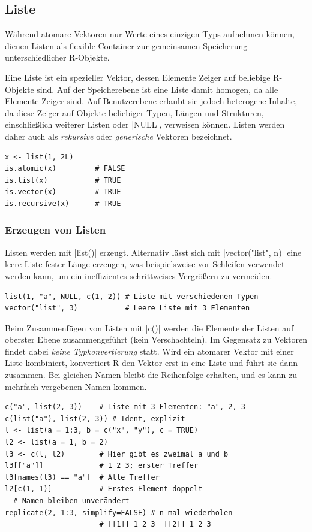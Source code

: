 \documentclass[10pt,twocolumn]{scrartcl}
\renewcommand{\lstinline}{\mycoloredinline}
\begin{document}
\subsection{Liste}

Während atomare Vektoren nur Werte eines einzigen Typs aufnehmen können, dienen Listen als flexible Container zur gemeinsamen Speicherung unterschiedlicher R-Objekte.

Eine Liste ist ein spezieller Vektor, dessen Elemente Zeiger auf beliebige R-Objekte sind. Auf der Speicherebene ist eine Liste damit homogen, da alle Elemente Zeiger sind. Auf Benutzerebene erlaubt sie jedoch heterogene Inhalte, da diese Zeiger auf Objekte beliebiger Typen, Längen und Strukturen, einschließlich weiterer Listen oder \lstinline|NULL|, verweisen können. Listen werden daher auch als \emph{rekursive} oder \emph{generische} Vektoren bezeichnet.


\begin{lstlisting}
x <- list(1, 2L)
is.atomic(x)         # FALSE
is.list(x)           # TRUE
is.vector(x)         # TRUE
is.recursive(x)      # TRUE
\end{lstlisting}


\subsubsection{Erzeugen von Listen}

Listen werden mit \lstinline|list()| erzeugt. Alternativ lässt sich mit \lstinline|vector("list", n)| eine leere Liste fester Länge erzeugen, was beispielsweise vor Schleifen verwendet werden kann, um ein ineffizientes schrittweises Vergrößern zu vermeiden.

\begin{lstlisting}
list(1, "a", NULL, c(1, 2)) # Liste mit verschiedenen Typen
vector("list", 3)           # Leere Liste mit 3 Elementen
\end{lstlisting}

Beim Zusammenfügen von Listen mit \lstinline|c()| werden die Elemente der Listen auf oberster Ebene zusammengeführt (kein Verschachteln). Im Gegensatz zu Vektoren findet dabei \emph{keine Typkonvertierung} statt. Wird ein atomarer Vektor mit einer Liste kombiniert, konvertiert R den Vektor erst in eine Liste und führt sie dann zusammen. Bei gleichen Namen bleibt die Reihenfolge erhalten, und es kann zu mehrfach vergebenen Namen kommen.

\begin{lstlisting}
c("a", list(2, 3))    # Liste mit 3 Elementen: "a", 2, 3
c(list("a"), list(2, 3)) # Ident, explizit
l <- list(a = 1:3, b = c("x", "y"), c = TRUE)
l2 <- list(a = 1, b = 2)
l3 <- c(l, l2)        # Hier gibt es zweimal a und b
l3[["a"]]             # 1 2 3; erster Treffer
l3[names(l3) == "a"]  # Alle Treffer
l2[c(1, 1)]           # Erstes Element doppelt
  # Namen bleiben unverändert
replicate(2, 1:3, simplify=FALSE) # n-mal wiederholen
                      # [[1]] 1 2 3  [[2]] 1 2 3
\end{lstlisting}
\end{document}
